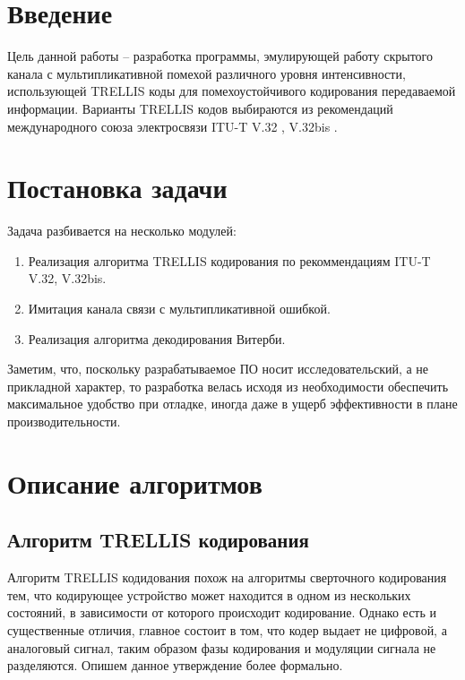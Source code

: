 \documentclass[a4paper,12pt]{article}
\begin{document}
\lstset{language=Java}

\section{Введение}

Цель данной работы – разработка программы, эмулирующей работу скрытого канала с мультипликативной помехой 
различного уровня интенсивности, использующей TRELLIS коды для помехоустойчивого кодирования передаваемой
информации. Варианты TRELLIS кодов выбираются из рекомендаций международного союза электросвязи 
ITU-T V.32 \cite{stV32}, V.32bis \cite{stV32bis}. 

\section{Постановка задачи}
Задача разбивается на несколько модулей:

\begin{enumerate}
    \item Реализация алгоритма TRELLIS кодирования по рекоммендациям ITU-T V.32, V.32bis.
    \item Имитация канала связи с мультипликативной ошибкой.
    \item Реализация алгоритма декодирования Витерби.
\end{enumerate}

Заметим, что, поскольку разрабатываемое ПО носит исследовательский, а не прикладной характер, то разработка
велась исходя из необходимости обеспечить максимальное удобство при отладке, иногда даже в ущерб эффективности
в плане производительности.

\section{Описание алгоритмов}

\subsection{Алгоритм TRELLIS кодирования}
Алгоритм TRELLIS кодидования похож на алгоритмы сверточного кодирования тем, что кодирующее устройство может
находится в одном из нескольких состояний, в зависимости от которого происходит кодирование. Однако есть и
существенные отличия, главное состоит в том, что кодер выдает не цифровой, а аналоговый сигнал, таким образом
фазы кодирования и модуляции сигнала не разделяются.
Опишем данное утверждение более формально.
\end{document}
